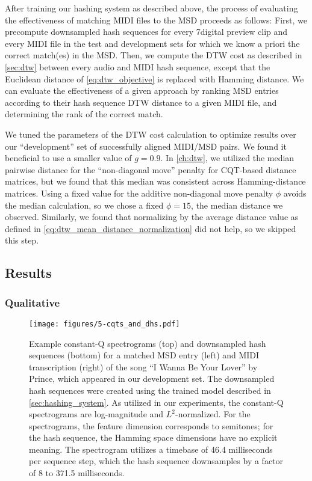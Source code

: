 After training our hashing system as described above, the process of evaluating the effectiveness of matching MIDI files to the MSD proceeds as follows:
First, we precompute downsampled hash sequences for every 7digital preview clip and every MIDI file in the test and development sets for which we know a priori the correct match(es) in the MSD.
Then, we compute the DTW cost as described in \cref{sec:dtw} between every audio and MIDI hash sequence, except that the Euclidean distance of \cref{eq:dtw_objective} is replaced with Hamming distance.
We can evaluate the effectiveness of a given approach by ranking MSD entries according to their hash sequence DTW distance to a given MIDI file, and determining the rank of the correct match.

We tuned the parameters of the DTW cost calculation to optimize results over our ``development'' set of successfully aligned MIDI/MSD pairs.
We found it beneficial to use a smaller value of $g = 0.9$.
In \cref{ch:dtw}, we utilized the median pairwise distance for the ``non-diagonal move'' penalty for CQT-based distance matrices, but we found that this median was consistent across Hamming-distance matrices.
Using a fixed value for the additive non-diagonal move penalty $\phi$ avoids the median calculation, so we chose a fixed $\phi = 15$, the median distance we observed.
Similarly, we found that normalizing by the average distance value as defined in \cref{eq:dtw_mean_distance_normalization} did not help, so we skipped this step.

\subsection{Results}

\subsubsection{Qualitative}

\begin{figure}
  \texttt{[image: figures/5-cqts\_and\_dhs.pdf]}
  \caption[Spectrograms and downsampled hash sequences for a matching pair]{Example constant-Q spectrograms (top) and downsampled hash sequences (bottom) for a matched MSD entry (left) and MIDI transcription (right) of the song ``I Wanna Be Your Lover'' by Prince, which appeared in our development set.
The downsampled hash sequences were created using the trained model described in \cref{sec:hashing_system}.
As utilized in our experiments, the constant-Q spectrograms are log-magnitude and $L^2$-normalized.
For the spectrograms, the feature dimension corresponds to semitones; for the hash sequence, the Hamming space dimensions have no explicit meaning.
The spectrogram utilizes a timebase of 46.4 milliseconds per sequence step, which the hash sequence downsamples by a factor of 8 to 371.5 milliseconds.}
  \label{fig:cqts_and_dhs}
\end{figure}

